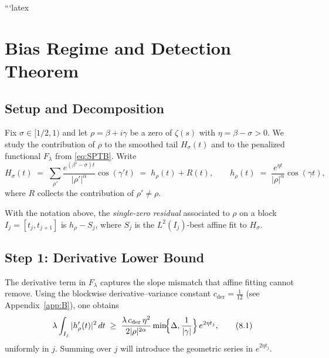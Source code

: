 ```latex

\section{Bias Regime and Detection Theorem}\label{sec:bias}

\subsection{Setup and Decomposition}

Fix $\sigma\in[1/2,1)$ and let $\rho=\beta+i\gamma$ be a zero of $\zeta(s)$ with
$\eta=\beta-\sigma>0$.  We study the contribution of $\rho$ to the smoothed tail
$H_\sigma(t)$ and to the penalized functional $F_\lambda$ from \eqref{eq:SPTB}.
Write
\begin{equation*}
H_\sigma(t)
 \;=\; \sum_{\rho'} \frac{e^{(\beta'-\sigma)t}}{|\rho'|^{\alpha}}\cos(\gamma' t)
 \;=\; h_\rho(t)+R(t),
\qquad
h_\rho(t)\;=\;\frac{e^{\eta t}}{|\rho|^{\alpha}}\cos(\gamma t),
\end{equation*}
where $R$ collects the contribution of $\rho'\neq\rho$.

\begin{definition}\label{def:single-zero}
With the notation above, the \emph{single-zero residual} associated to $\rho$ on a block
$I_j=[t_j,t_{j+1}]$ is $h_\rho-S_j$, where $S_j$ is the $L^2(I_j)$-best affine fit to $H_\sigma$.
\end{definition}

\subsection{Step 1: Derivative Lower Bound}\label{step:derivative-lb}

The derivative term in $F_\lambda$ captures the slope mismatch that affine fitting cannot
remove.  Using the blockwise derivative–variance constant
$c_{\mathrm{der}}=\tfrac1{12}$ (see Appendix~\ref{app:B}), one obtains
\begin{equation}
\lambda \int_{I_j} |h_\rho'(t)|^2 \, dt
  \;\ge\; \frac{\lambda\, c_{\mathrm{der}}\,\eta^2}{2|\rho|^{2\alpha}}
  \min\!\Bigl\{\Delta,\frac{1}{|\gamma|}\Bigr\}
  \,e^{2\eta t_j},
\tag{8.1}\label{eq:derivative-lb}
\end{equation}
uniformly in $j$.  Summing over $j$ will introduce the geometric series in $e^{2\eta t_j}$.

